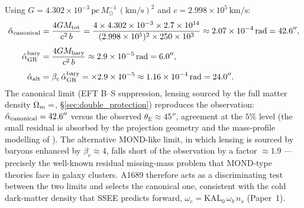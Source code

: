 \documentclass[12pt,a4paper]{article}
\newcommand{\KAL}{\mathrm{KAL}_0}
\newcommand{\bc}{\beta_c}
\newcommand{\thetaE}{\theta_{\mathrm{E}}}
\newcommand{\hatalf}{\hat{\alpha}}
\begin{document}
Using $G = 4.302\times10^{-3}\,\mathrm{pc}\,M_\odot^{-1}\,(\mathrm{km/s})^2$
and $c = 2.998\times10^5\,\mathrm{km/s}$:
\begin{align}
  \hatalf_{\rm canonical} &= \frac{4GM_{\rm tot}}{c^2\,b}
    = \frac{4 \times 4.302\times10^{-3} \times 2.7\times10^{14}}{(2.998\times10^5)^2 \times 250\times10^3}
    \approx 2.07\times10^{-4}\,\mathrm{rad} = 42.6'', \\[4pt]
  \hatalf_{\rm GR}^{\rm bary} &= \frac{4GM_{\rm bary}}{c^2\,b}
    \approx 2.9\times10^{-5}\,\mathrm{rad} = 6.0'', \\[4pt]
  \hatalf_{\rm alt} &= \bc\,\hatalf_{\rm GR}^{\rm bary}
    = \val{AURA_d6} \times 2.9\times10^{-5}
    \approx 1.16\times10^{-4}\,\mathrm{rad} = 24.0''.
\end{align}
The canonical limit (EFT B--S suppression, lensing sourced by the full
matter density $\Omega_m=\val{OMEGA_M_TOTAL_d6}$, \S\ref{sec:double_protection}) reproduces the
observation: $\hatalf_{\rm canonical} = 42.6''$ versus the observed
$\thetaE \approx 45''$, agreement at the $5\%$ level (the small residual
is absorbed by the projection geometry and the mass-profile modelling of
\citealp{Limousin2007}).
The alternative MOND-like limit, in which lensing is sourced by baryons
enhanced by $\bc \approx 4$, falls short of the observation by a factor
$\approx 1.9$ --- precisely the well-known residual missing-mass problem
that MOND-type theories face in galaxy clusters.
A1689 therefore acts as a discriminating test between the two limits and
selects the canonical one, consistent with the cold dark-matter density
that SSEE predicts forward, $\omega_c=\KAL\,\omega_b\,n_s$
(Paper~1).%
\end{document}
